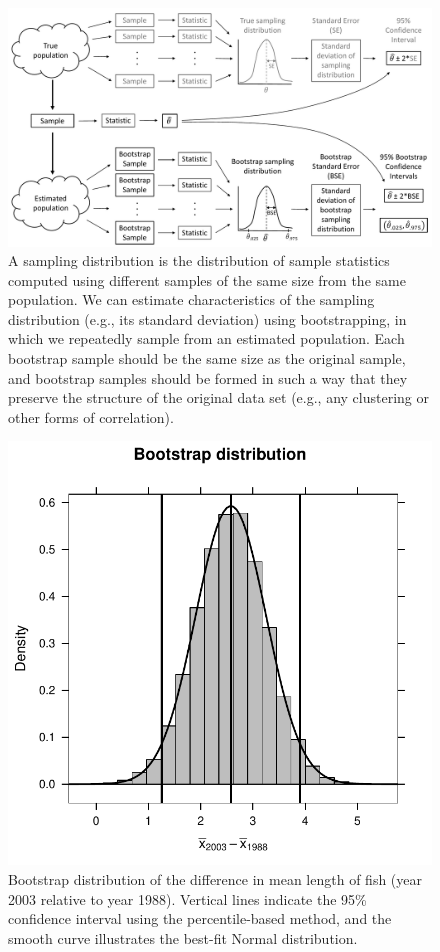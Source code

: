 \documentclass[fleqn,10pt]{wlpeerj} %
\begin{document}

\begin{figure}
\includegraphics[width=1\linewidth]{FigureBoot} \caption{A sampling distribution is the distribution of sample statistics computed using different samples of the same size from the same population. We can estimate characteristics of the sampling distribution (e.g., its standard deviation) using bootstrapping, in which we repeatedly sample from an estimated population.  Each bootstrap sample should be the same size as the original sample, and bootstrap samples should be formed in such a way that they preserve the structure of the original data set (e.g., any clustering or other forms of correlation).}\label{fig:figure2}
\end{figure}




\begin{figure}
\includegraphics[width=0.5\linewidth]{B4B_files/figure-latex/figure3-1} \caption{Bootstrap distribution of the difference in mean length of fish (year 2003 relative to year 1988). Vertical lines indicate the 95\% confidence interval using the percentile-based method, and the smooth curve illustrates the best-fit Normal distribution.}\label{fig:figure3}
\end{figure}
\end{document}
